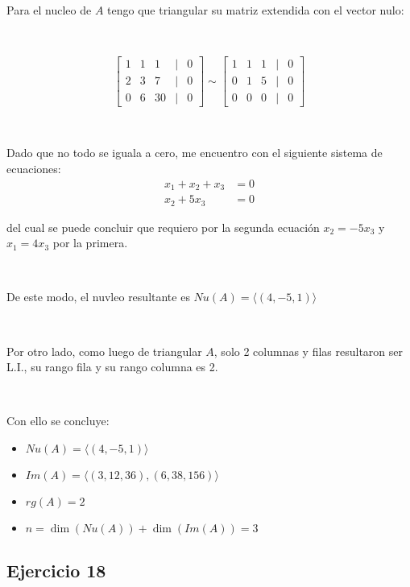 \documentclass{article}
\begin{document}
\

\noindent Para el nucleo de $A$ tengo que triangular su matriz extendida con el vector nulo:

\

\[
\begin{bmatrix}
    1 & 1 & 1 & | & 0 \\
    2 & 3 & 7 & | & 0 \\
    0 & 6 & 30 & | & 0 
\end{bmatrix}
\sim
\begin{bmatrix}
    1 & 1 & 1 & | & 0 \\
    0 & 1 & 5 & | & 0 \\
    0 & 0 & 0 & | & 0
\end{bmatrix}
\]

\

\noindent Dado que no todo se iguala a cero, me encuentro con el siguiente sistema de ecuaciones:
\begin{align*}
    x_1 + x_2 + x_3 &= 0 \\
    x_2 + 5x_3 &= 0
\end{align*}

del cual se puede concluir que requiero por la segunda ecuación $x_2 = -5x_3$ y $x_1 = 4x_3$ por la primera.

\

\noindent De este modo, el nuvleo resultante es $Nu(A) = \langle (4,-5,1) \rangle$

\

\noindent Por otro lado, como luego de triangular $A$, solo 2 columnas y filas resultaron ser L.I.,
su rango fila y su rango columna es 2.

\

Con ello se concluye:

\begin{itemize}
    \item $Nu(A) = \langle (4,-5,1) \rangle$ 
    \item $Im(A) = \langle (3,12,36), (6, 38, 156) \rangle$
    \item $rg(A) = 2$
    \item $n = \dim(Nu(A)) + \dim(Im(A)) = 3$  
\end{itemize}

\newpage

\subsection*{Ejercicio 18}

\
\end{document}

